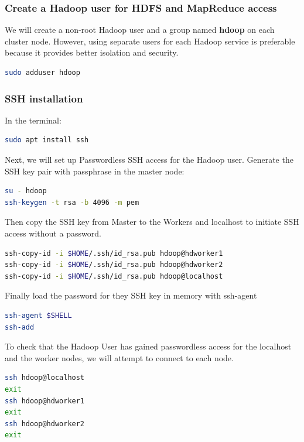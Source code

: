 \documentclass[12pt,english]{book}
\begin{document}
\subsubsection{Create a Hadoop user for HDFS and MapReduce access}


We will create a non-root Hadoop user and a group named \textbf{hdoop} on each cluster node. However, using separate users for each Hadoop service is preferable because it provides better isolation and security.
\begin{lstlisting}[language=bash, frame=single, basicstyle=\footnotesize]
sudo adduser hdoop
\end{lstlisting}


\subsubsection{SSH installation}

In the terminal:

\begin{lstlisting}[language=bash, frame=single, basicstyle=\footnotesize]
sudo apt install ssh
\end{lstlisting}

Next, we will set up Passwordless SSH access for the Hadoop user.
Generate the SSH key pair with passphrase in the master node:
\begin{lstlisting}[language=bash, frame=single, basicstyle=\footnotesize]
su - hdoop
ssh-keygen -t rsa -b 4096 -m pem
\end{lstlisting}
Then copy the SSH key from Master to the Workers and localhost to initiate SSH access without a password.
\begin{lstlisting}[language=bash, frame=single, basicstyle=\footnotesize]
ssh-copy-id -i $HOME/.ssh/id_rsa.pub hdoop@hdworker1
ssh-copy-id -i $HOME/.ssh/id_rsa.pub hdoop@hdworker2
ssh-copy-id -i $HOME/.ssh/id_rsa.pub hdoop@localhost
\end{lstlisting}
Finally load the password for they SSH key in memory with ssh-agent
\begin{lstlisting}[language=bash, frame=single, basicstyle=\footnotesize]
ssh-agent $SHELL
ssh-add
\end{lstlisting}
To check that the Hadoop User has gained passwordless access for the localhost and the worker nodes, we will attempt to connect to each node.
\begin{lstlisting}[language=bash, frame=single, basicstyle=\footnotesize]
ssh hdoop@localhost
exit
ssh hdoop@hdworker1
exit
ssh hdoop@hdworker2
exit
\end{lstlisting}
\end{document}
